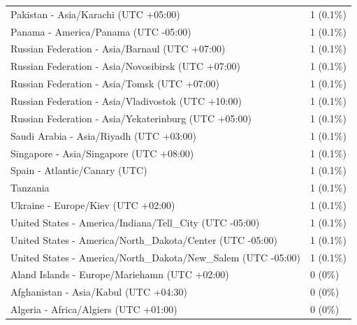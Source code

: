\documentclass[
  english,
  man]{apa6}
\begin{document}
\begin{appendix}
\begin{table}
{\begin{tabular}[t]{ll}
\hspace{1em}Pakistan - Asia/Karachi (UTC +05:00) & 1 (0.1\%)\\
\addlinespace
\hspace{1em}Panama - America/Panama (UTC -05:00) & 1 (0.1\%)\\
\hspace{1em}Russian Federation - Asia/Barnaul (UTC +07:00) & 1 (0.1\%)\\
\hspace{1em}Russian Federation - Asia/Novosibirsk (UTC +07:00) & 1 (0.1\%)\\
\hspace{1em}Russian Federation - Asia/Tomsk (UTC +07:00) & 1 (0.1\%)\\
\hspace{1em}Russian Federation - Asia/Vladivostok (UTC +10:00) & 1 (0.1\%)\\
\addlinespace
\hspace{1em}Russian Federation - Asia/Yekaterinburg (UTC +05:00) & 1 (0.1\%)\\
\hspace{1em}Saudi Arabia - Asia/Riyadh (UTC +03:00) & 1 (0.1\%)\\
\hspace{1em}Singapore - Asia/Singapore (UTC +08:00) & 1 (0.1\%)\\
\hspace{1em}Spain - Atlantic/Canary (UTC) & 1 (0.1\%)\\
\hspace{1em}Tanzania & 1 (0.1\%)\\
\addlinespace
\hspace{1em}Ukraine - Europe/Kiev (UTC +02:00) & 1 (0.1\%)\\
\hspace{1em}United States - America/Indiana/Tell\_City (UTC -05:00) & 1 (0.1\%)\\
\hspace{1em}United States - America/North\_Dakota/Center (UTC -05:00) & 1 (0.1\%)\\
\hspace{1em}United States - America/North\_Dakota/New\_Salem (UTC -05:00) & 1 (0.1\%)\\
\hspace{1em}Aland Islands - Europe/Mariehamn (UTC +02:00) & 0 (0\%)\\
\addlinespace
\hspace{1em}Afghanistan - Asia/Kabul (UTC +04:30) & 0 (0\%)\\
\hspace{1em}Algeria - Africa/Algiers (UTC +01:00) & 0 (0\%)\\

\end{tabular}}
\end{table}
\end{appendix}
\end{document}
